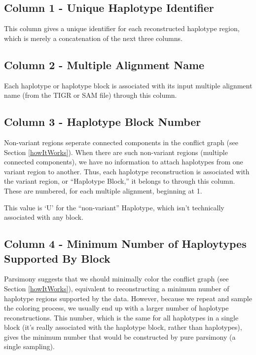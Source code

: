 \documentclass[11pt]{llncs}
\begin{document}
\subsection{Column 1 - Unique Haplotype Identifier}

This column gives a unique identifier for each reconstructed haplotype region, which is merely a concatenation of the next three columns.

\subsection{Column 2 - Multiple Alignment Name}

Each haplotype or haplotype block is associated with its input multiple alignment name (from the TIGR or SAM file) through this column.

\subsection{Column 3 - Haplotype Block Number}

Non-variant regions seperate connected components in the conflict graph (see Section \ref{howItWorks}). When there are such non-variant regions 
(multiple connected components), we have no information to attach haplotypes from one variant region to another. Thus, each haplotype reconstruction
is associated with the variant region, or ``Haplotype Block,'' it belongs to through this column. These are numbered, for each multiple alignment, 
beginning at 1.

This value is `U' for the ``non-variant'' Haplotype, which isn't technically associated with any block.

\subsection{Column 4 - Minimum Number of Haploytypes Supported By Block}

Parsimony suggests that we should minimally color the conflict graph (see Section \ref{howItWorks}), equivalent to reconstructing a 
minimum number of haplotype regions supported by the data. However, because we repeat and sample the coloring process, we usually
end up with a larger number of haplotype reconstructions. This number, which is the same for all haplotypes in a single block (it's really
associated with the haplotype block, rather than haplotypes), gives the minimum number that would be constructed by pure parsimony (a single 
sampling).
\end{document}

